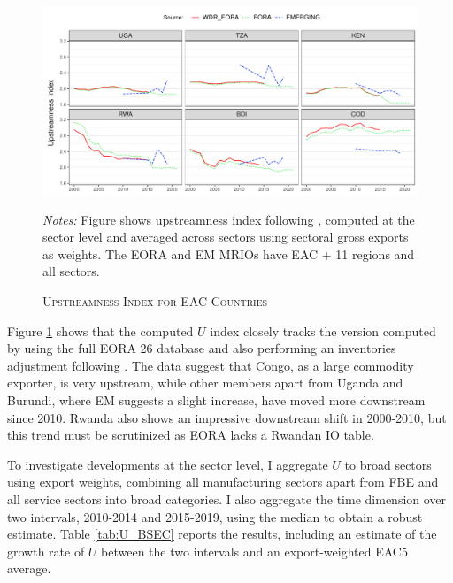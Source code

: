 \documentclass[a4paper]{article}
\begin{document}
\begin{figure}[h!]
\centering
\caption{\label{fig:EACUS_ag_ts}\textsc{Upstreamness Index for EAC Countries}}
\includegraphics[width=1\textwidth]{"Figures/Upstreamness_ag_ts.pdf"} \\ \raggedright
\scriptsize
\emph{Notes:} Figure shows upstreamness index following \citet{antras2012measuring}, computed at the sector level and averaged across sectors using sectoral gross exports as weights. The EORA and EM MRIOs have EAC + 11 regions and all sectors.  
\end{figure}
\FloatBarrier

Figure \ref{fig:EACUS_ag_ts} shows that the computed $U$ index closely tracks the version computed by \citet{mancini2023positioning} using the full EORA 26 database and also performing an inventories adjustment following \citet{antras2018measurement}. The data suggest that Congo, as a large commodity exporter, is very upstream, while other members apart from Uganda and Burundi, where EM suggests a slight increase, have moved more downstream since 2010. Rwanda also shows an impressive downstream shift in 2000-2010, but this trend must be scrutinized as EORA lacks a Rwandan IO table. \newline

To investigate developments at the sector level, I aggregate $U$ to broad sectors using export weights, combining all manufacturing sectors apart from FBE and all service sectors into broad categories. I also aggregate the time dimension over two intervals, 2010-2014 and 2015-2019, using the median to obtain a robust estimate. Table \ref{tab:U_BSEC} reports the results, including an estimate of the growth rate of $U$ between the two intervals and an export-weighted EAC5 average. \newline 
\end{document}
